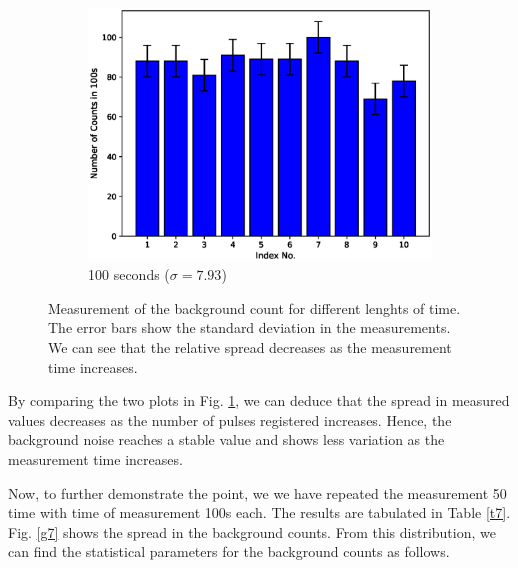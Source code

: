 \begin{figure}
    \ContinuedFloat
    \begin{subfigure}{\linewidth}
        \centering
        \includegraphics[width=1\columnwidth]{images/spread2.eps}
        \caption{100 seconds ($\sigma = 7.93$)}
    \end{subfigure}
    \caption{Measurement of the background count for different lenghts of time. The error bars show the standard deviation in the measurements. We can see that the relative spread decreases as the measurement time increases.}
    \label{g6}
\end{figure}

By comparing the two plots in Fig. \ref{g6}, we can deduce that the spread in measured values decreases as the number of pulses registered increases. Hence, the background noise reaches a stable value and shows less variation as the measurement time increases.

Now, to further demonstrate the point, we we have repeated the measurement 50 time with time of measurement 100s each. The results are tabulated in Table \ref{t7}. Fig. \ref{g7} shows the spread in the background counts. From this distribution, we can find the statistical parameters for the background counts as follows.

